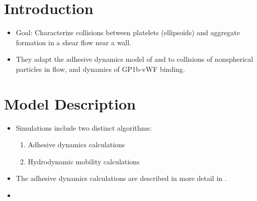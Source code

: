 \documentclass[
10pt, %
letterpaper, %
twocolumn, %
landscape %
]{article}
\begin{document}
\pagestyle{myheadings} %
\markright{\doctitle} %


\thispagestyle{plain} %

\printtitle %


\section{Introduction}

\begin{itemize}
\item Goal: Characterize collisions between platelets (ellipsoids) and
  aggregate formation in a shear flow near a wall.
\item They adapt the adhesive dynamics model of \cite{Hammer1992} and
  \cite{King2001} to collisions of nonspherical particles in flow, and
  dynamics of GP1b-vWF binding.
\end{itemize}


\section{Model Description}

\begin{itemize}
\item Simulations include two distinct algorithms:
  \begin{enumerate}
  \item Adhesive dynamics calculations
  \item Hydrodynamic mobility calculations
  \end{enumerate}
\item The adhesive dynamics calculations are described in more detail
  in \cite{King2001}.
\item 
\end{itemize}

\end{document}
